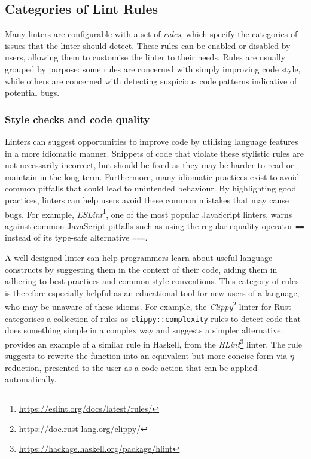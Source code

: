 \documentclass[../../main.tex]{subfiles}
\begin{document}
\subsection{Categories of Lint Rules}

Many linters are configurable with a set of \emph{rules}, which specify the categories of issues that the linter should detect.
These rules can be enabled or disabled by users, allowing them to customise the linter to their needs.
Rules are usually grouped by purpose: some rules are concerned with simply improving code style, while others are concerned with detecting suspicious code patterns indicative of potential bugs.

\subsubsection{Style checks and code quality}
Linters can suggest opportunities to improve code by utilising language features in a more idiomatic manner.
Snippets of code that violate these stylistic rules are not necessarily incorrect, but should be fixed as they may be harder to read or maintain in the long term.
Furthermore, many idiomatic practices exist to avoid common pitfalls that could lead to unintended behaviour.
By highlighting good practices, linters can help users avoid these common mistakes that may cause bugs.
For example, \emph{ESLint}\footnote{\url{https://eslint.org/docs/latest/rules/}}, one of the most popular JavaScript linters, warns against common JavaScript pitfalls such as using the regular equality operator \texttt{==} instead of its type-safe alternative \texttt{===}.

A well-designed linter can help programmers learn about useful language constructs by suggesting them in the context of their code, aiding them in adhering to best practices and common style conventions.
This category of rules is therefore especially helpful as an educational tool for new users of a language, who may be unaware of these idioms.
For example, the \emph{Clippy}\footnote{\url{https://doc.rust-lang.org/clippy/}} linter for Rust~\cite{li_clippy_2023} categorises a collection of rules as \texttt{clippy::complexity} rules to detect code that does something simple in a complex way and suggests a simpler alternative.
 provides an example of a similar rule in Haskell, from the \textit{HLint}\footnote{\url{https://hackage.haskell.org/package/hlint}} linter.
The rule suggests to rewrite the function into an equivalent but more concise form via $\eta$-reduction, presented to the user as a code action that can be applied automatically.
\end{document}
